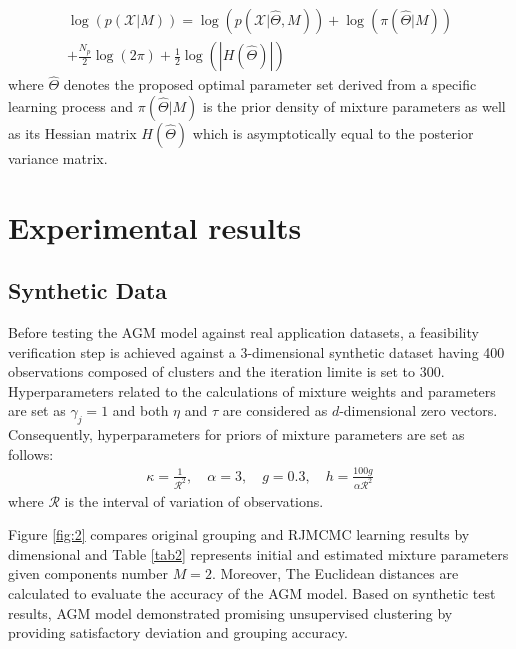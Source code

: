\documentclass[conference]{IEEEtran}
\begin{document}
\begin{multline}
\log(p(\mathcal{X}|M)) = \log(p(\mathcal{X}|\hat{\Theta},M)) + \log(\pi(\hat{\Theta}|M)) \\
 + \frac{N_p}{2}\log(2\pi)+\frac{1}{2}\log(|H(\hat{\Theta})|)\qquad\quad
\label{eq:margLikeli}
\end{multline}
where $\hat{\Theta}$ denotes the proposed optimal parameter set derived from a specific learning process and $\pi(\hat{\Theta}|M)$ is the prior density of mixture parameters as well as its Hessian matrix $H(\hat{\Theta})$ which is asymptotically equal to the posterior variance matrix.

\section{Experimental results}
\subsection{Synthetic Data}
Before testing the AGM model against real application datasets, a feasibility verification step is achieved against a 3-dimensional synthetic dataset having 400 observations composed of clusters and the iteration limite is set to 300. Hyperparameters related to the calculations of mixture weights and parameters are set as $\gamma_j = 1$ and both $\eta$ and $\tau$ are considered as $d$-dimensional zero vectors. Consequently, hyperparameters for priors of mixture parameters are set as follows\cite{Stephens2000}:
\begin{align}
\kappa = \frac{1}{\mathcal{R}^2}, \quad \alpha = 3, \quad g=0.3, \quad h=\frac{100g}{\alpha\mathcal{R}^2}
\label{eq:hypers}
\end{align}
where $\mathcal{R}$ is the interval of variation of observations.

Figure \ref{fig:2} compares original grouping and RJMCMC learning results by dimensional and Table \ref{tab2} represents initial and estimated mixture parameters given components number $M=2$. Moreover, The Euclidean distances are calculated to evaluate the accuracy of the AGM model. Based on synthetic test results, AGM model demonstrated promising unsupervised clustering by providing satisfactory deviation and grouping accuracy.
\end{document}
